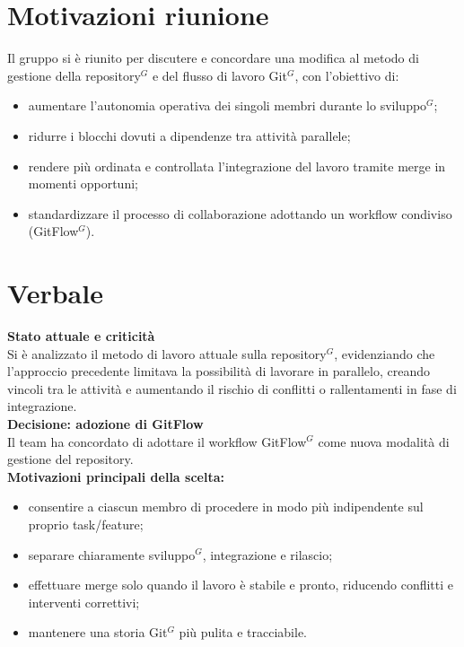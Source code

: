 \documentclass[a4paper,10pt]{article}
\begin{document}
\section*{Motivazioni riunione}
Il gruppo si è riunito per discutere e concordare una modifica al metodo di gestione della repository$^G$ e del flusso di lavoro Git$^G$, con l’obiettivo di:
\begin{itemize}
\item aumentare l’autonomia operativa dei singoli membri durante lo sviluppo$^G$;
\item ridurre i blocchi dovuti a dipendenze tra attività parallele;
\item rendere più ordinata e controllata l’integrazione del lavoro tramite merge in momenti opportuni;
\item standardizzare il processo di collaborazione adottando un workflow condiviso (GitFlow$^G$).
\end{itemize}
\newpage

\section*{Verbale}
\textbf{Stato attuale e criticità} \\

Si è analizzato il metodo di lavoro attuale sulla repository$^G$, evidenziando che l’approccio precedente limitava la possibilità di lavorare in parallelo, creando vincoli tra le attività e aumentando il rischio di conflitti o rallentamenti in fase di integrazione. \\

\textbf{Decisione: adozione di GitFlow} \\

Il team ha concordato di adottare il workflow GitFlow$^G$ come nuova modalità di gestione del repository. \\

\textbf{Motivazioni principali della scelta:}
\begin{itemize}
\item consentire a ciascun membro di procedere in modo più indipendente sul proprio task/feature;
\item separare chiaramente sviluppo$^G$, integrazione e rilascio;
\item effettuare merge solo quando il lavoro è stabile e pronto, riducendo conflitti e interventi correttivi;
\item mantenere una storia Git$^G$ più pulita e tracciabile.
\end{itemize} 
\end{document}
